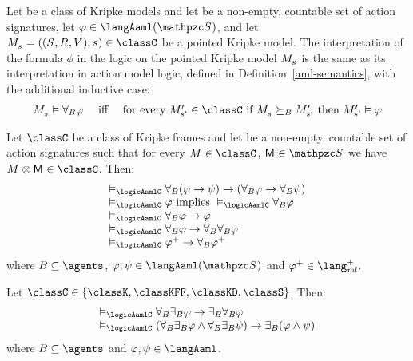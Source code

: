 \begin{definition}\label{aaml-semantics-alt}
Let \classC{} be a class of Kripke models and let \aSignatureFamily{} be a non-empty, countable set of action signatures, let $\phi \in \langAaml(\aSignatureFamily)$, and let $\kPModelAndTuple{\kStateS} \in \classC$ be a pointed Kripke model.
The interpretation of the formula $\phi$ in the logic \logicAamlC{} on the pointed Kripke model $\kPModel{\kStateS}$ is the same as its interpretation in action model logic, defined in Definition~\ref{aml-semantics}, with the additional inductive case:
$$
\begin{array}{lcl}
    \kPModel{\kStateS} \entails \allactsBs \phi & \text{ iff } & \text{for every } \kPModelP{\kStateSP} \in \classC \text{ if } \kPModel{\kStateS} \simulatesBs \kPModelP{\kStateSP} \text{ then } \kPModelP{\kStateSP} \entails \phi
\end{array}
$$
\end{definition}

\begin{proposition}\label{aaml-validities}
Let $\classC$ be a class of Kripke frames and let \aSignatureFamily{} be a non-empty, countable set of action signatures such that for every $\kModel \in \classC$, $\aModel \in \aSignatureFamily$ we have $\kModel \exec \aModel \in \classC$. Then:
$$
\begin{array}{l}
    \entails_\logicAamlC \allrefsBs (\phi \implies \psi) \implies (\allrefsBs \phi \implies \allrefsBs \psi)\\
    \entails_\logicAamlC \phi \text{ implies } \entails_\logicAamlC \allrefsBs \phi\\
    \entails_\logicAamlC \allrefsBs \phi \implies \phi\\
    \entails_\logicAamlC \allrefsBs \phi \implies \allrefsBs \allrefsBs \phi\\
    \entails_\logicAamlC \phi^+ \implies \allrefsBs \phi^+
\end{array}
$$
where $\agentsB \subseteq \agents$, $\phi, \psi \in \langAaml(\aSignatureFamily)$ and $\phi^+ \in \langMlPlus$.
\end{proposition}

\begin{proposition}\label{aaml-mckinsey}
Let $\classC \in \{\classK, \classKFF, \classKD, \classS\}$. Then:
$$
\begin{array}{l}
    \entails_\logicAamlC \allrefsBs \somerefsBs \phi \implies \somerefsBs \allrefsBs \phi\\
    \entails_\logicAamlC (\allrefsBs \somerefsBs \phi \land \allrefsBs \somerefsBs \psi) \implies \somerefsBs (\phi \land \psi)
\end{array}
$$
where $\agentsB \subseteq \agents$ and $\phi, \psi \in \langAaml$.
\end{proposition}


